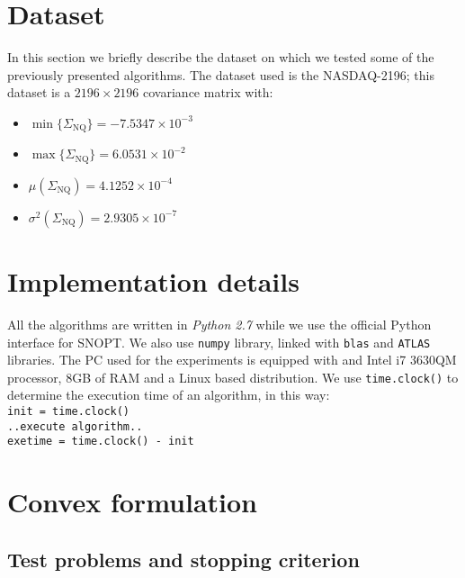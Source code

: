 \section{Dataset}
In this section we briefly describe the dataset on which we tested some of the previously presented algorithms. The dataset used is the NASDAQ-2196\footnotemark[1]; this dataset is a $2196 \times 2196$ covariance matrix with:
\begin{itemize}
\item $\min \{\Sigma_{\text{NQ}}\} = -7.5347 \times 10^{-3} $
\item $\max \{\Sigma_{\text{NQ}}\} = 6.0531 \times 10^{-2} $
\item $\mu(\Sigma_{\text{NQ}}) = 4.1252 \times 10^{-4} $
\item $\sigma^2(\Sigma_{\text{NQ}}) = 2.9305 \times 10^{-7}$
\end{itemize}

\section{Implementation details}
All the algorithms are written in \textit{Python 2.7} while we use the official Python interface for SNOPT. We also use \texttt{numpy} library, linked with \texttt{blas} and \texttt{ATLAS} libraries. The PC used for the experiments is equipped with and Intel i7 3630QM processor, 8GB of RAM and a Linux based distribution. We use \texttt{time.clock()} to determine the execution time of an algorithm, in this way:\\
\texttt{init = time.clock()}\\
\texttt{..execute algorithm..}\\
\texttt{exetime = time.clock() - init}\\

\section{Convex formulation}
\subsection{Test problems and stopping criterion}

